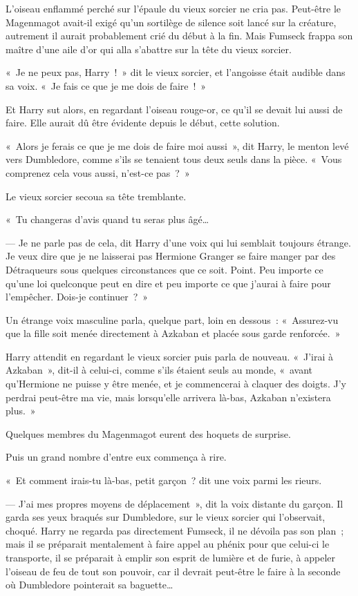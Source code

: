 L'oiseau enflammé perché sur l'épaule du vieux sorcier ne cria pas.
Peut-être le Magenmagot avait-il exigé qu'un sortilège de silence soit lancé sur la créature, autrement il aurait probablement crié du début à la fin.
Mais Fumseck frappa son maître d'une aile d'or qui alla s'abattre sur la tête du vieux sorcier.

«~Je ne peux pas, Harry~!~»
dit le vieux sorcier, et l'angoisse était audible dans sa voix.
«~Je fais ce que je me dois de faire~!~»

Et Harry sut alors, en regardant l'oiseau rouge-or, ce qu'il se devait lui aussi de faire.
Elle aurait dû être évidente depuis le début, cette solution.

«~Alors je ferais ce que je me dois de faire moi aussi~», dit Harry, le menton levé vers Dumbledore, comme s'ils se tenaient tous deux seuls dans la pièce.
«~Vous comprenez cela vous aussi, n'est-ce pas~?~»

Le vieux sorcier secoua sa tête tremblante.

«~Tu changeras d'avis quand tu seras plus âgé…

--- Je ne parle pas de cela, dit Harry d'une voix qui lui semblait toujours étrange.
Je veux dire que je ne laisserai pas Hermione Granger se faire manger par des Détraqueurs sous quelques circonstances que ce soit.
Point. Peu importe ce qu'une loi quelconque peut en dire et peu importe ce que j'aurai à faire pour l'empêcher.
Dois-je continuer~?~»

Un étrange voix masculine parla, quelque part, loin en dessous~: «~Assurez-vu que la fille soit menée directement à Azkaban et placée sous garde renforcée.~»

Harry attendit en regardant le vieux sorcier puis parla de nouveau.
«~J'irai à Azkaban~», dit-il à celui-ci, comme s'ils étaient seuls au monde, «~avant qu'Hermione ne puisse y être menée, et je commencerai à claquer des doigts.
J'y perdrai peut-être ma vie, mais lorsqu'elle arrivera là-bas, Azkaban n'existera plus.~»

Quelques membres du Magenmagot eurent des hoquets de surprise.

Puis un grand nombre d'entre eux commença à rire.

«~Et comment irais-tu là-bas, petit garçon~? dit une voix parmi les rieurs.

--- J'ai mes propres moyens de déplacement~», dit la voix distante du garçon.
Il garda ses yeux braqués sur Dumbledore, sur le vieux sorcier qui l'observait, choqué.
Harry ne regarda pas directement Fumseck, il ne dévoila pas son plan~; mais il se préparait mentalement à faire appel au phénix pour que celui-ci le transporte, il se préparait à emplir son esprit de lumière et de furie, à appeler l'oiseau de feu de tout son pouvoir, car il devrait peut-être le faire à la seconde où Dumbledore pointerait sa baguette…

